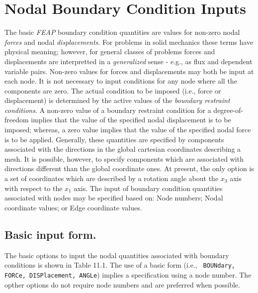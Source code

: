 \section{Nodal Boundary Condition Inputs}
\label{bc}

The basic {\sl FEAP} boundary condition quantities
are values for non-zero nodal {\it forces} and nodal {\it displacements}.
For problems in solid mechanics these terms have physical meaning; however,
for general classes of problems forces and displacements are interpretted
in a {\it generalized} sense - e.g., as flux and dependent variable pairs.
Non-zero values for forces and displacements may both be input
at each node.  It is not necessary to input conditions for
any node where all the components are zero.  The actual condition
to be imposed (i.e., force or displacement)
is determined by the active values of the {\it boundary
restraint conditions}.  A non-zero value of a boundary restraint
condition for a degree-of-freedom implies that the value of the
specified nodal displacement is to be imposed; whereas, a zero
value implies that the value of the specified nodal force is to be
applied.  Generally,
these quantities are specified by components associated with the
directions in the global cartesian coordinates describing a mesh.
It is possible, however, to specify components
which are associated with directions different than the global coordinate ones.
At present, the only option is a set of coordinates which are described
by a rotation angle about the $x_3$ axis with respect to the $x_1$ axis.
The input of boundary condition quantities associated with nodes may
be specified based on: Node numbers; Nodal coordinate values; or
Edge coordinate values.

\subsection{Basic input form.}

The basic options to input the nodal quantities associated with boundary
conditions is shown in Table 11.1.  The use of a basic form (i.e., {\tt
BOUNdary, FORCe, DISPlacement, ANGLe}) implies a specification using
a node number.  The opther options do not require node numbers and are
preferred when possible.

